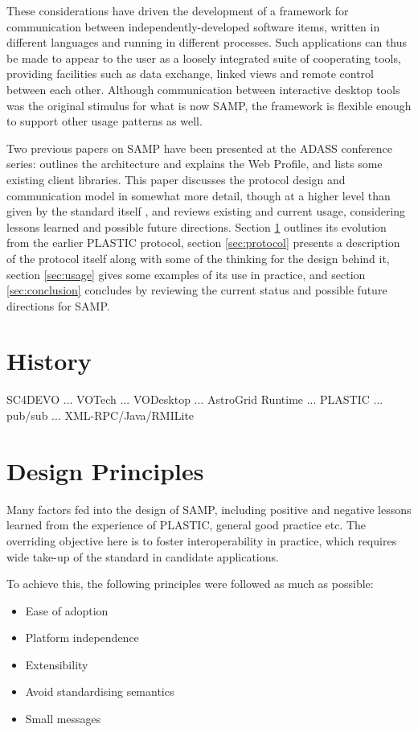 \documentclass[5p]{elsarticle}
\begin{document}
These considerations have driven the development of a framework
for communication between independently-developed software items,
written in different languages and running in different processes.
Such applications can thus be made to appear to the user
as a loosely integrated suite of cooperating tools,
providing facilities such as data exchange, linked views and
remote control between each other.
Although communication between interactive desktop tools was the
original stimulus for what is now SAMP, the framework is flexible
enough to support other usage patterns as well.

Two previous papers on SAMP have been presented at the ADASS conference
series:
\citet{adassxxi_paper} outlines the architecture and explains
the Web Profile, and \citet{adassxxii_bof} lists some existing
client libraries.
This paper discusses the protocol design and communication model
in somewhat more detail, though at a higher level than given by the
standard itself \citep{samp_std}, and reviews existing and current
usage, considering lessons learned and possible future directions.
Section \ref{sec:history} outlines its evolution from
the earlier PLASTIC protocol,
section \ref{sec:protocol} presents a description of the protocol itself
along with some of the thinking for the design behind it,
section \ref{sec:usage} gives some examples of its use in practice, and
section \ref{sec:conclusion} concludes by reviewing the current status
and possible future directions for SAMP.

\section{History} \label{sec:history}
 
SC4DEVO ... VOTech ... VODesktop ... AstroGrid Runtime ...
PLASTIC ... pub/sub ... XML-RPC/Java/RMILite
\citep{plastic_note}


\section{Design Principles} \label{sec:design}

Many factors fed into the design of SAMP,
including positive and negative lessons learned
from the experience of PLASTIC, 
general good practice etc.
The overriding objective here is to foster interoperability in practice,
which requires wide take-up of the standard in candidate applications.

To achieve this, the following principles were followed as much as possible:
\begin{itemize}
\item Ease of adoption
\item Platform independence
\item Extensibility
\item Avoid standardising semantics
\item Small messages
\end{itemize}
\end{document}
